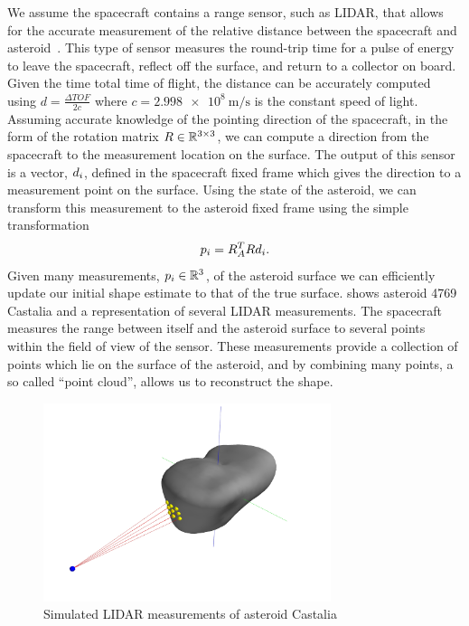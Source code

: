 \documentclass[letterpaper, paper,11pt]{AAS}		%
\begin{document}
We assume the spacecraft contains a range sensor, such as LIDAR, that allows for the accurate measurement of the relative distance between the spacecraft and asteroid~\cite{zuber1997,zuber2000}.
This type of sensor measures the round-trip time for a pulse of energy to leave the spacecraft, reflect off the surface, and return to a collector on board.
Given the time total time of flight, the distance can be accurately computed using \( d = \frac{\Delta TOF}{2 c} \) where \( c = \SI{2.998e8}{\meter\per\second}\) is the constant speed of light.
Assuming accurate knowledge of the pointing direction of the spacecraft, in the form of the rotation matrix \( R \in \mathbb{R}^{3 \times 3 } \), we can compute a direction from the spacecraft to the measurement location on the surface.
The output of this sensor is a vector, \( d_i \), defined in the spacecraft fixed frame which gives the direction to a measurement point on the surface. 
Using the state of the asteroid, we can transform this measurement to the asteroid fixed frame using the simple transformation
\begin{align*}
    p_i = R_A^T R d_i .
\end{align*}
Given many measurements, \( p_i \in \mathbb{R}^3 \), of the asteroid surface we can efficiently update our initial shape estimate to that of the true surface.
 shows asteroid 4769 Castalia and a representation of several LIDAR measurements. 
The spacecraft measures the range between itself and the asteroid surface to several points within the field of view of the sensor. 
These measurements provide a collection of points which lie on the surface of the asteroid, and by combining many points, a so called ``point cloud'', allows us to reconstruct the shape.
\begin{figure}
    \centering
    \includegraphics[width=0.75\textwidth]{figures/castalia_raycasting_plot.jpg}
    \caption{Simulated LIDAR measurements of asteroid Castalia~\label{fig:lidar_example}}
\end{figure}
\end{document}
